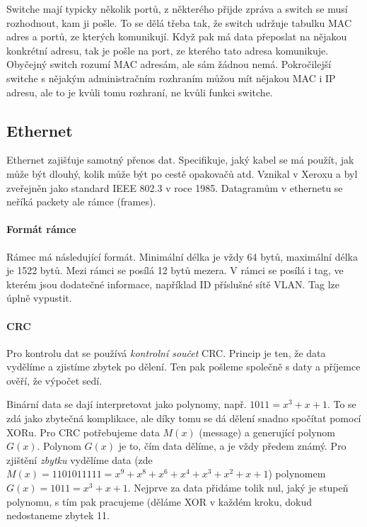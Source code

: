 Switche mají typicky několik portů, z některého přijde zpráva a switch se musí rozhodnout, kam ji pošle. To se dělá třeba tak, že switch udržuje tabulku MAC adres a portů, ze kterých komunikují. Když pak má data přeposlat na nějakou konkrétní adresu, tak je pošle na port, ze kterého tato adresa komunikuje. Obyčejný switch rozumí MAC adresám, ale sám žádnou nemá. Pokročilejší switche s nějakým administračním rozhraním můžou mít nějakou MAC i IP adresu, ale to je kvůli tomu rozhraní, ne kvůli funkci switche.

\subsection{Ethernet}

Ethernet zajišťuje samotný přenos dat. Specifikuje, jaký kabel se má použít, jak může být dlouhý, kolik může být po cestě opakovačů atd. Vznikal v Xeroxu a byl zveřejněn jako standard IEEE 802.3 v roce 1985. Datagramům v ethernetu se neříká packety ale rámce (frames).

\paragraph{Formát rámce}

Rámec má následující formát. Minimální délka je vždy 64 bytů, maximální délka je 1522 bytů. Mezi rámci se posílá 12 bytů mezera. V rámci se posílá i tag, ve kterém jsou dodatečné informace, například ID příslušné sítě VLAN. Tag lze úplně vypustit.

\begin{table}[ht!]
\end{table}

\paragraph{CRC} Pro kontrolu dat se používá \textit{kontrolní součet} CRC. Princip je ten, že data vydělíme a zjistíme zbytek po dělení. Ten pak pošleme společně s daty a příjemce ověří, že výpočet sedí.

Binární data se dají interpretovat jako polynomy, např. $1011 = x^3 + x + 1$. To se zdá jako zbytečná komplikace, ale díky tomu se dá dělení snadno spočítat pomocí XORu. Pro CRC potřebujeme data $M(x)$ (message) a generující polynom $G(x)$. Polynom $G(x)$ je to, čím data dělíme, a je vždy předem známý. Pro zjištění \textit{zbytku} vydělíme data (zde $M(x) = 1101011111 = x^9 + x^8 + x^6 + x^4 + x^3 + x^2 + x + 1$) polynomem $G(x) = 1011 = x^3 + x + 1$. Nejprve za data přidáme tolik nul, jaký je stupeň polynomu, s tím pak pracujeme (děláme XOR v každém kroku, dokud nedostaneme zbytek 11.

